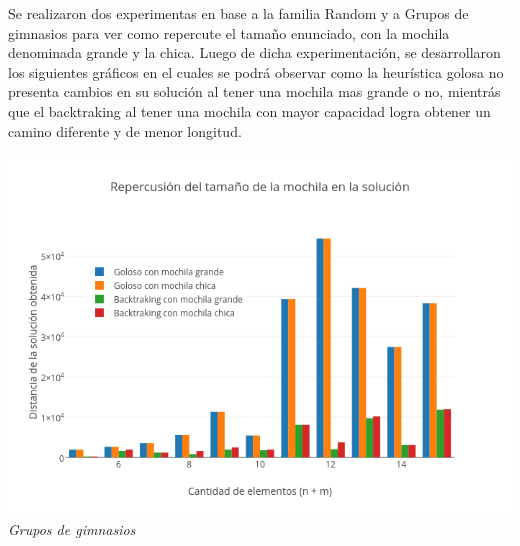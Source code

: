 Se realizaron dos experimentas en base a la familia Random y a Grupos de gimnasios para ver como repercute el tamaño enunciado, con la mochila denominada grande y la chica. Luego de dicha experimentación, se desarrollaron los siguientes gr\'aficos en el cuales se podr\'a observar como la heur\'istica golosa no presenta cambios en su soluci\'on al tener una mochila mas grande o no, mientr\'as que el backtraking al tener una mochila con mayor capacidad logra obtener un camino diferente y de menor longitud.\\

\vspace*{0.3cm} \vspace*{0.3cm}
  \begin{center}
\includegraphics[scale=0.60]{./EJ2/familiaMochila.png}
\\{\textit{Grupos de gimnasios}}
  \end{center}
  \vspace*{0.3cm}
  \begin{figure} [h]
 \centering
    \label{fig:comparativo1}
    \label{fig:comparativo2}
    \end{figure}
  
